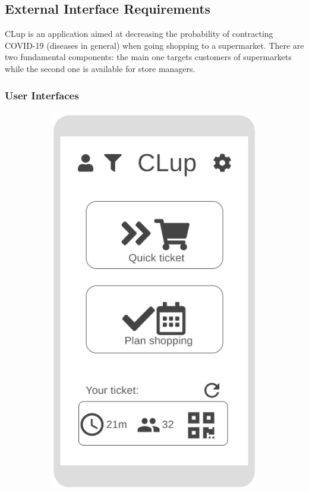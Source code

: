 
\subsection{External Interface Requirements}
CLup is an application aimed at decreasing the probability of contracting COVID-19 (diseases in general) when going shopping to a supermarket. There are two fundamental components: the main one targets customers of supermarkets while the second one is available for store managers.\newline
\subsubsection{User Interfaces}
\begin{figure}[h!]
	\centering
	\begin{subfigure}[b]{0.3\textwidth}
		\includegraphics[width=\linewidth]{../Diagrams/WireframesCLup/MainScreen.png}

\end{subfigure}
\end{figure}
